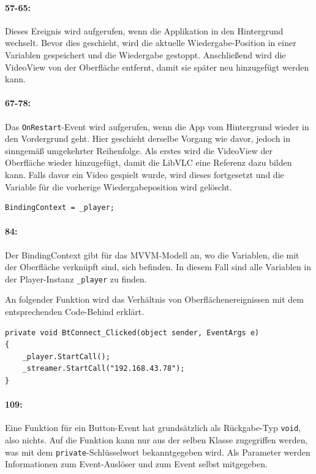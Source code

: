 \paragraph{57-65:} Dieses Ereignis wird aufgerufen, wenn die Applikation in den Hintergrund wechselt.
Bevor dies geschieht, wird die aktuelle Wiedergabe-Position in einer Variablen gespeichert und die Wiedergabe gestoppt.
Anschließend wird die VideoView von der Oberfläche entfernt, damit sie später neu hinzugefügt werden kann.
\paragraph{67-78:} Das \texttt{OnRestart}-Event wird aufgerufen, wenn die App vom Hintergrund wieder in den Vordergrund geht.
Hier geschieht derselbe Vorgang wie davor, jedoch in sinngemäß umgekehrter Reihenfolge.
Als erstes wird die VideoView der Oberfläche wieder hinzugefügt, damit die LibVLC eine Referenz dazu bilden kann.
Falls davor ein Video gespielt wurde, wird dieses fortgesetzt und die Variable für die vorherige Wiedergabeposition wird gelöscht.

\begin{lstlisting}[firstnumber=84]
BindingContext = _player;
\end{lstlisting}
\paragraph{84:} Der BindingContext gibt für das MVVM-Modell an, wo die Variablen, die mit der Oberfläche verknüpft sind, sich befinden.
In diesem Fall sind alle Variablen in der Player-Instanz \texttt{\_player} zu finden.

An folgender Funktion wird das Verhältnis von Oberflächenereignissen mit dem entsprechenden Code-Behind erklärt.
\begin{lstlisting}[firstnumber=109]
private void BtConnect_Clicked(object sender, EventArgs e)
{
    _player.StartCall();
    _streamer.StartCall("192.168.43.78");
}
\end{lstlisting}
\paragraph{109:} Eine Funktion für ein Button-Event hat grundsätzlich als Rückgabe-Typ \texttt{void}, also nichts.
Auf die Funktion kann nur aus der selben Klasse zugegriffen werden, was mit dem \texttt{private}-Schlüsselwort bekanntgegeben wird.
Als Parameter werden Informationen zum Event-Auslöser und zum Event selbst mitgegeben.
